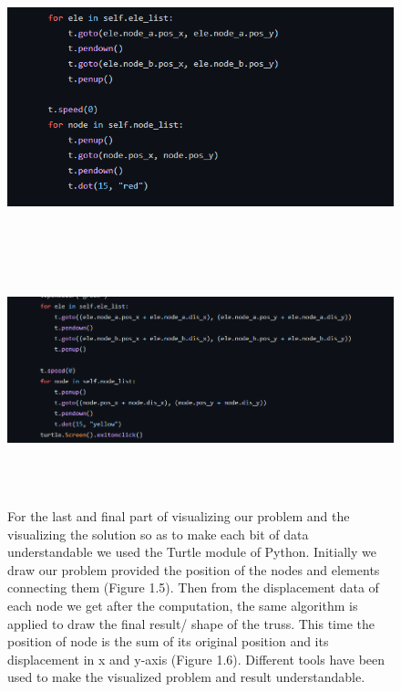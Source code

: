 \documentclass[a4paper,12pt]{report}
\begin{document}
\begin{figure}
\includegraphics[width = 15cm, height = 8cm]{ini_vis}
\caption{}
\vspace{1cm}
\includegraphics[width = 15cm, height = 7cm]{fin_vis}
\caption{}
\vspace{1cm}

For the last and final part of visualizing our problem and the visualizing the solution so as to make each bit of data understandable we used the Turtle module of Python. Initially we draw our problem provided the position of the nodes and elements connecting them (Figure 1.5). Then from the displacement data of each node we get after the computation, the same algorithm is applied to draw the final result/ shape of the truss. This time the position of node is the sum of its original position and its displacement in x and y-axis (Figure 1.6). Different tools have been used to make the visualized problem and result understandable.
\end{figure}
\end{document}
